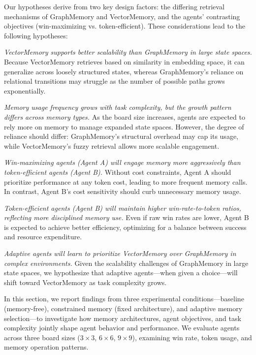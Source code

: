 \documentclass[10pt]{article}
\begin{document}
Our hypotheses derive from two key design factors: the differing retrieval mechanisms of GraphMemory and VectorMemory, and the agents' contrasting objectives (win-maximizing vs. token-efficient). These considerations lead to the following hypotheses:

\begin{description}[itemsep=0.5em, parsep=0.5em]
\item[\textbf{H1.1}] \textit{VectorMemory supports better scalability than GraphMemory in large state spaces.} 
Because VectorMemory retrieves based on similarity in embedding space, it can generalize across loosely structured states, whereas GraphMemory's reliance on relational transitions may struggle as the number of possible paths grows exponentially.

\item[\textbf{H1.2}] \textit{Memory usage frequency grows with task complexity, but the growth pattern differs across memory types.} 
As the board size increases, agents are expected to rely more on memory to manage expanded state spaces. However, the degree of reliance should differ: GraphMemory's structural overhead may cap its usage, while VectorMemory's fuzzy retrieval allows more scalable engagement.

\item[\textbf{H2.1}] \textit{Win-maximizing agents (Agent A) will engage memory more aggressively than token-efficient agents (Agent B).} 
Without cost constraints, Agent A should prioritize performance at any token cost, leading to more frequent memory calls. In contrast, Agent B's cost sensitivity should curb unnecessary memory usage.

\item[\textbf{H2.2}] \textit{Token-efficient agents (Agent B) will maintain higher win-rate-to-token ratios, reflecting more disciplined memory use.} 
Even if raw win rates are lower, Agent B is expected to achieve better efficiency, optimizing for a balance between success and resource expenditure.

\item[\textbf{H3}] \textit{Adaptive agents will learn to prioritize VectorMemory over GraphMemory in complex environments.} 
Given the scalability challenges of GraphMemory in large state spaces, we hypothesize that adaptive agents—when given a choice—will shift toward VectorMemory as task complexity grows.
\end{description}

In this section, we report findings from three experimental conditions---baseline (memory-free), constrained memory (fixed architecture), and adaptive memory selection---to investigate how memory architectures, agent objectives, and task complexity jointly shape agent behavior and performance. We evaluate agents across three board sizes ($3\times3$, $6\times6$, $9\times9$), examining win rate, token usage, and memory operation patterns.
\end{document}
